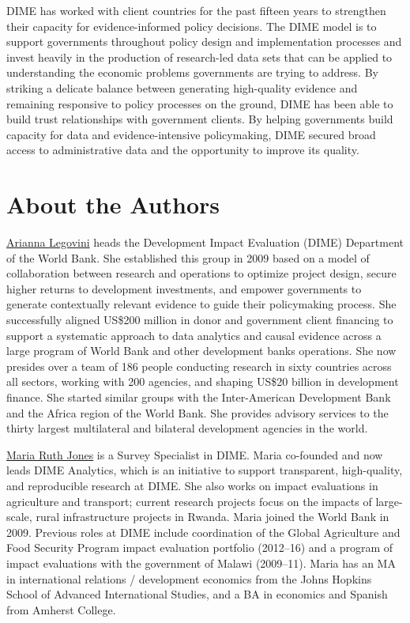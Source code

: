 DIME has worked with client countries for the past fifteen years to strengthen their capacity for evidence-informed policy decisions. The DIME model is to support governments throughout policy design and implementation processes and invest heavily in the production of research-led data sets that can be applied to understanding the economic problems governments are trying to address. By striking a delicate balance between generating high-quality evidence and remaining responsive to policy processes on the ground, DIME has been able to build trust relationships with government clients. By helping governments build capacity for data and evidence-intensive policymaking, DIME secured broad access to administrative data and the opportunity to improve its quality.

\hypertarget{about-the-authors-8}{%
\section*{About the Authors}\label{about-the-authors-8}}

\href{https://www.worldbank.org/en/about/people/a/arianna-legovini}{Arianna Legovini} heads the Development Impact Evaluation (DIME) Department of the World Bank. She established this group in 2009 based on a model of collaboration between research and operations to optimize project design, secure higher returns to development investments, and empower governments to generate contextually relevant evidence to guide their policymaking process. She successfully aligned US\$200 million in donor and government client financing to support a systematic approach to data analytics and causal evidence across a large program of World Bank and other development banks operations. She now presides over a team of 186 people conducting research in sixty countries across all sectors, working with 200 agencies, and shaping US\$20 billion in development finance. She started similar groups with the Inter-American Development Bank and the Africa region of the World Bank. She provides advisory services to the thirty largest multilateral and bilateral development agencies in the world.

\href{https://www.worldbank.org/en/about/people/m/maria-ruth-jones}{Maria Ruth Jones} is a Survey Specialist in DIME. Maria co-founded and now leads DIME Analytics, which is an initiative to support transparent, high-quality, and reproducible research at DIME. She also works on impact evaluations in agriculture and transport; current research projects focus on the impacts of large-scale, rural infrastructure projects in Rwanda. Maria joined the World Bank in 2009. Previous roles at DIME include coordination of the Global Agriculture and Food Security Program impact evaluation portfolio (2012--16) and a program of impact evaluations with the government of Malawi (2009--11). Maria has an MA in international relations / development economics from the Johns Hopkins School of Advanced International Studies, and a BA in economics and Spanish from Amherst College.

\putbib

